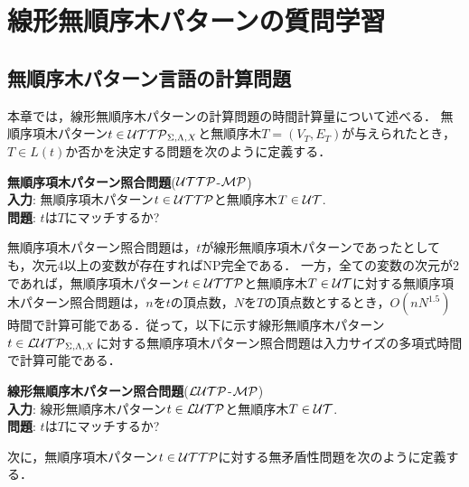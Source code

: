 \section{線形無順序木パターンの質問学習}


\subsection{無順序木パターン言語の計算問題}
本章では，線形無順序木パターンの計算問題の時間計算量について述べる．
無順序項木パターン$t\in{\cal UTTP}_{\Sigma,\Lambda,X}$と無順序木$T=(V_T,E_T)$が与えられたとき，$T\in L(t)$か否かを決定する問題を次のように定義する．

\medskip
\noindent
\textbf{無順序項木パターン照合問題}(${\cal UTTP}$-${\cal MP}$)\\
\textbf{入力}: 無順序項木パターン$t\in {\cal UTTP}$と無順序木$T\in {\cal UT}$.\\
\textbf{問題}: $t$は$T$にマッチするか?
\medskip

無順序項木パターン照合問題は，$t$が線形無順序項木パターンであったとしても，次元4以上の変数が存在すればNP完全である\cite{shoudai-ieice2018}．
一方，全ての変数の次元が2であれば，無順序項木パターン$t\in {\cal UTTP}$と無順序木$T\in {\cal UT}$に対する無順序項木パターン照合問題は，$n$を$t$の頂点数，$N$を$T$の頂点数とするとき，$O(nN^{1.5})$時間で計算可能である\cite{shoudai-ieice2018}．従って，以下に示す線形無順序木パターン$t\in{\cal LUTP}_{\Sigma,\Lambda,X}$に対する無順序項木パターン照合問題は入力サイズの多項式時間で計算可能である．

\medskip
\noindent
\textbf{線形無順序木パターン照合問題}(${\cal LUTP}$-${\cal MP}$)\\
\textbf{入力}: 線形無順序木パターン$t\in {\cal LUTP}$と無順序木$T\in {\cal UT}$.\\
\textbf{問題}: $t$は$T$にマッチするか?
\medskip

次に，無順序項木パターン$t\in {\cal UTTP}$に対する無矛盾性問題を次のように定義する．

